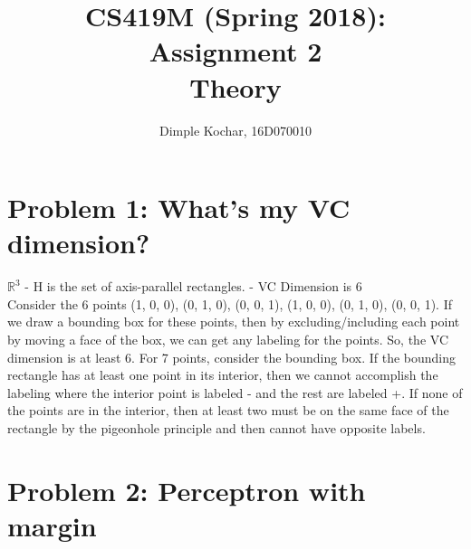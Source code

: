 \documentclass[12pt]{article}
\title{CS419M (Spring 2018): Assignment 2\\
Theory}
\author{Dimple Kochar, 16D070010}
\begin{document}
\maketitle

\section{Problem 1: What's my VC dimension?}
$\mathbb{R}^{3}$ - H is the set of axis-parallel rectangles. - VC Dimension is 6\\
Consider the 6 points (1, 0, 0), (0, 1, 0), (0, 0, 1), (1, 0, 0), (0, 1, 0), (0, 0, 1). If we draw a bounding box for these points, then by excluding/including each point
by moving a face of the box, we can get any labeling for the points. So, the VC dimension is at least 6. For 7 points, consider the bounding box. If the bounding
rectangle has at least one point in its interior, then we cannot accomplish the labeling where the interior point is labeled - and the rest are labeled +. 
If none of the points are in the interior, then at least two must be on the same face of the rectangle by the pigeonhole principle and then cannot have opposite labels.

\section{Problem 2: Perceptron with margin}
\end{document}
